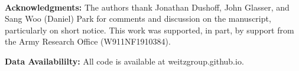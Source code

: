\mbox{}\\
\noindent
\textbf{Acknowledgments:} The authors thank Jonathan Dushoff, John Glasser,
and Sang Woo (Daniel) Park for comments
and discussion on the manuscript, particularly on short notice. 
This work was supported, in part,
by support from the Army Research Office (W911NF1910384).

\noindent
\textbf{Data Availabililty:} All code is available at weitzgroup.github.io.
